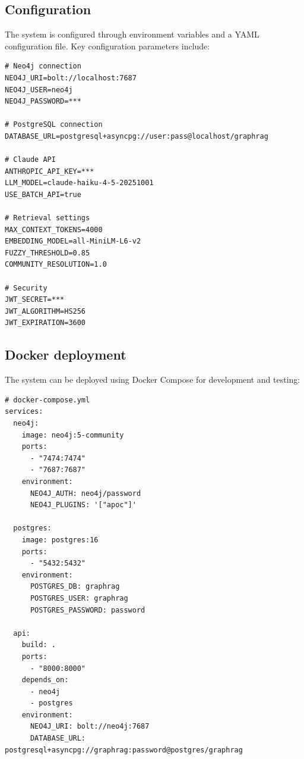 \documentclass[review]{elsarticle}
\begin{document}
\subsection{Configuration}

The system is configured through environment variables and a YAML configuration file. Key configuration parameters include:

\begin{lstlisting}[language={}, caption={Key configuration parameters.}, label={lst:config}]
# Neo4j connection
NEO4J_URI=bolt://localhost:7687
NEO4J_USER=neo4j
NEO4J_PASSWORD=***

# PostgreSQL connection
DATABASE_URL=postgresql+asyncpg://user:pass@localhost/graphrag

# Claude API
ANTHROPIC_API_KEY=***
LLM_MODEL=claude-haiku-4-5-20251001
USE_BATCH_API=true

# Retrieval settings
MAX_CONTEXT_TOKENS=4000
EMBEDDING_MODEL=all-MiniLM-L6-v2
FUZZY_THRESHOLD=0.85
COMMUNITY_RESOLUTION=1.0

# Security
JWT_SECRET=***
JWT_ALGORITHM=HS256
JWT_EXPIRATION=3600
\end{lstlisting}

\subsection{Docker deployment}

The system can be deployed using Docker Compose for development and testing:

\begin{lstlisting}[language={}, caption={Docker Compose configuration for local deployment.}, label={lst:docker}]
# docker-compose.yml
services:
  neo4j:
    image: neo4j:5-community
    ports:
      - "7474:7474"
      - "7687:7687"
    environment:
      NEO4J_AUTH: neo4j/password
      NEO4J_PLUGINS: '["apoc"]'

  postgres:
    image: postgres:16
    ports:
      - "5432:5432"
    environment:
      POSTGRES_DB: graphrag
      POSTGRES_USER: graphrag
      POSTGRES_PASSWORD: password

  api:
    build: .
    ports:
      - "8000:8000"
    depends_on:
      - neo4j
      - postgres
    environment:
      NEO4J_URI: bolt://neo4j:7687
      DATABASE_URL: postgresql+asyncpg://graphrag:password@postgres/graphrag
\end{lstlisting}




\end{document}
